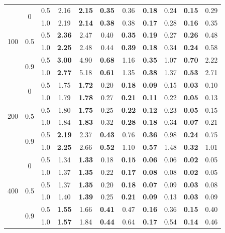 \documentclass[authoryear,review, 12pt]{elsarticle}
\begin{document}
\begin{table}
\begin{tabular}{|ccc|cc|cc|cc|cc|}
  \multirow{6}{*}{100} & \multirow{2}{*}{0} & 0.5 & 2.16 & \textbf{2.15} & \textbf{0.35} & 0.36 & \textbf{0.18} & 0.24 & \textbf{0.15} & 0.29 \\ 
    &  & 1.0 & 2.19 & \textbf{2.14} & \textbf{0.38} & 0.38 & \textbf{0.17} & 0.28 & \textbf{0.16} & 0.35 \\ 
    & \multirow{2}{*}{0.5} & 0.5 & \textbf{2.36} & 2.47 & 0.40 & \textbf{0.35} & \textbf{0.19} & 0.27 & \textbf{0.26} & 0.48 \\ 
    &  & 1.0 & \textbf{2.25} & 2.48 & 0.44 & \textbf{0.39} & \textbf{0.18} & 0.34 & \textbf{0.24} & 0.58 \\ 
    & \multirow{2}{*}{0.9} & 0.5 & \textbf{3.00} & 4.90 & \textbf{0.68} & 1.16 & \textbf{0.35} & 1.07 & \textbf{0.70} & 2.22 \\ 
    &  & 1.0 & \textbf{2.77} & 5.18 & \textbf{0.61} & 1.35 & \textbf{0.38} & 1.37 & \textbf{0.53} & 2.71 \\ 
   \hline \multirow{6}{*}{200} & \multirow{2}{*}{0} & 0.5 & 1.75 & \textbf{1.72} & 0.20 & \textbf{0.18} & \textbf{0.09} & 0.15 & \textbf{0.03} & 0.10 \\ 
    &  & 1.0 & 1.79 & \textbf{1.78} & 0.27 & \textbf{0.21} & \textbf{0.11} & 0.22 & \textbf{0.05} & 0.13 \\ 
    & \multirow{2}{*}{0.5} & 0.5 & 1.80 & \textbf{1.75} & 0.25 & \textbf{0.22} & \textbf{0.12} & 0.23 & \textbf{0.05} & 0.15 \\ 
    &  & 1.0 & 1.84 & \textbf{1.83} & 0.32 & \textbf{0.28} & \textbf{0.18} & 0.34 & \textbf{0.07} & 0.21 \\ 
    & \multirow{2}{*}{0.9} & 0.5 & \textbf{2.19} & 2.37 & \textbf{0.43} & 0.76 & \textbf{0.36} & 0.98 & \textbf{0.24} & 0.75 \\ 
    &  & 1.0 & \textbf{2.25} & 2.66 & \textbf{0.52} & 1.10 & \textbf{0.57} & 1.48 & \textbf{0.32} & 1.01 \\ 
   \hline \multirow{6}{*}{400} & \multirow{2}{*}{0} & 0.5 & 1.34 & \textbf{1.33} & 0.18 & \textbf{0.15} & \textbf{0.06} & 0.06 & \textbf{0.02} & 0.05 \\ 
    &  & 1.0 & 1.37 & \textbf{1.35} & 0.22 & \textbf{0.17} & \textbf{0.08} & 0.08 & \textbf{0.02} & 0.05 \\ 
    & \multirow{2}{*}{0.5} & 0.5 & 1.37 & \textbf{1.35} & 0.20 & \textbf{0.18} & \textbf{0.07} & 0.09 & \textbf{0.03} & 0.08 \\ 
    &  & 1.0 & 1.40 & \textbf{1.39} & 0.25 & \textbf{0.21} & \textbf{0.09} & 0.13 & \textbf{0.03} & 0.09 \\ 
    & \multirow{2}{*}{0.9} & 0.5 & \textbf{1.55} & 1.66 & \textbf{0.41} & 0.47 & \textbf{0.16} & 0.36 & \textbf{0.15} & 0.40 \\ 
    &  & 1.0 & \textbf{1.57} & 1.84 & \textbf{0.44} & 0.64 & \textbf{0.17} & 0.54 & \textbf{0.14} & 0.46 \\ 
  


\end{tabular}
\end{table}
\end{document}
